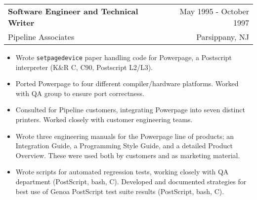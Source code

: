 \documentclass{article}
\begin{document}
  \begin{tabular*}{6.5in}{l@{\extracolsep{\fill}}r}
    \textbf{Software Engineer and Technical Writer} & May 1995 - October 1997 \\
    Pipeline Associates & Parsippany, NJ \\
  \end{tabular*}
  \begin{itemize}
  \item Wrote \texttt{setpagedevice} paper handling code for
    Powerpage, a Postscript interpreter (K\&R C, C90, Postscript
    L2/L3).
  \item Ported Powerpage to four different compiler/hardware
    platforms.  Worked with QA group to ensure port correctness.
  \item Consulted for Pipeline customers, integrating Powerpage into
    seven distinct printers.  Worked closely with customer engineering
    teams.
  \item Wrote three engineering manuals for the Powerpage line of
    products; an Integration Guide, a Programming Style Guide, and a
    detailed Product Overview.  These were used both by customers and
    as marketing material.
  \item Wrote scripts for automated regression tests, working closely
    with QA department (PostScript, bash, C).  Developed and
    documented strategies for best use of Genoa PostScript test suite
    results (PostScript, bash, C).
  \end{itemize}
\end{document}
